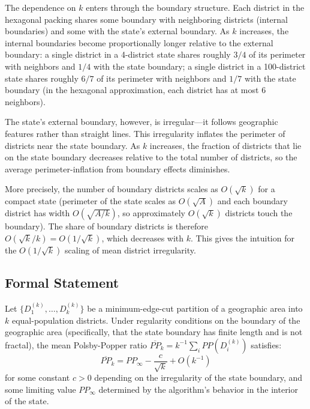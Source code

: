 The dependence on $k$ enters through the boundary structure. Each district in the hexagonal packing shares some boundary with neighboring districts (internal boundaries) and some with the state's external boundary. As $k$ increases, the internal boundaries become proportionally longer relative to the external boundary: a single district in a 4-district state shares roughly $3/4$ of its perimeter with neighbors and $1/4$ with the state boundary; a single district in a 100-district state shares roughly $6/7$ of its perimeter with neighbors and $1/7$ with the state boundary (in the hexagonal approximation, each district has at most 6 neighbors).

The state's external boundary, however, is irregular---it follows geographic features rather than straight lines. This irregularity inflates the perimeter of districts near the state boundary. As $k$ increases, the fraction of districts that lie on the state boundary decreases relative to the total number of districts, so the average perimeter-inflation from boundary effects diminishes.

More precisely, the number of boundary districts scales as $O(\sqrt{k})$ for a compact state (perimeter of the state scales as $O(\sqrt{A})$ and each boundary district has width $O(\sqrt{A/k})$, so approximately $O(\sqrt{k})$ districts touch the boundary). The share of boundary districts is therefore $O(\sqrt{k}/k) = O(1/\sqrt{k})$, which decreases with $k$. This gives the intuition for the $O(1/\sqrt{k})$ scaling of mean district irregularity.

\subsection{Formal Statement}

\begin{proposition}
Let $\{D_1^{(k)}, \ldots, D_k^{(k)}\}$ be a minimum-edge-cut partition of a geographic area into $k$ equal-population districts. Under regularity conditions on the boundary of the geographic area (specifically, that the state boundary has finite length and is not fractal), the mean Polsby-Popper ratio $\overline{PP}_k = k^{-1}\sum_i PP(D_i^{(k)})$ satisfies:
\begin{equation}
  \overline{PP}_k = PP_\infty - \frac{c}{\sqrt{k}} + O(k^{-1})
  \label{eq:scaling}
\end{equation}
for some constant $c > 0$ depending on the irregularity of the state boundary, and some limiting value $PP_\infty$ determined by the algorithm's behavior in the interior of the state.
\end{proposition}


